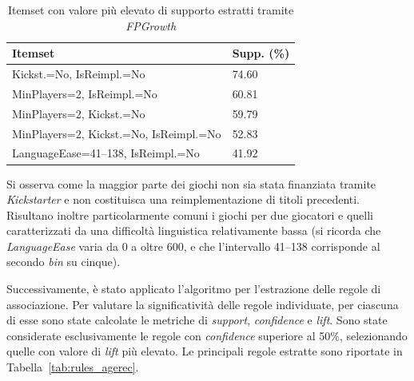 \documentclass[10pt,twocolumn]{article}
\begin{document}
\begin{table}[ht]
\centering
\begin{tabular}{|l|l|}
	\hline
	Itemset & Supp. (\%) \\
	\hline
	Kickst.=No, IsReimpl.=No & 74.60 \\
	MinPlayers=2, IsReimpl.=No & 60.81 \\
	MinPlayers=2, Kickst.=No & 59.79 \\
        MinPlayers=2, Kickst.=No, IsReimpl.=No & 52.83 \\
        LanguageEase=41--138, IsReimpl.=No & 41.92 \\
	\hline
\end{tabular}
\caption{Itemset con valore più elevato di supporto estratti tramite \textit{FPGrowth}}
\label{tab:itemsets_fp}
\end{table}

Si osserva come la maggior parte dei giochi non sia stata finanziata tramite \textit{Kickstarter} e non costituisca una reimplementazione di titoli precedenti. Risultano inoltre particolarmente comuni i giochi per due giocatori e quelli caratterizzati da una difficoltà linguistica relativamente bassa (si ricorda che \textit{LanguageEase} varia da 0 a oltre 600, e che l’intervallo 41--138 corrisponde al secondo \textit{bin} su cinque).

Successivamente, è stato applicato l’algoritmo per l’estrazione delle regole di associazione. Per valutare la significatività delle regole individuate, per ciascuna di esse sono state calcolate le metriche di \textit{support}, \textit{confidence} e \textit{lift}. Sono state considerate esclusivamente le regole con \textit{confidence} superiore al 50\%, selezionando quelle con valore di \textit{lift} più elevato. Le principali regole estratte sono riportate in Tabella~\ref{tab:rules_agerec}.
\end{document}

